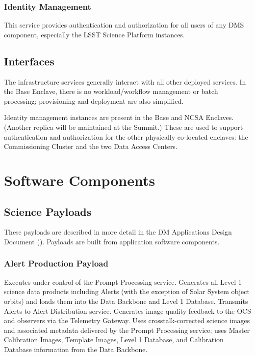 \documentclass[DM,toc]{lsstdoc}
\begin{document}
\subsubsection{Identity Management}\label{identity-management}

This service provides authentication and authorization for all users of
any DMS component, especially the LSST Science Platform instances.

\subsection{Interfaces}\label{infrastructure-interfaces}

The infrastructure services generally interact with all other deployed
services.  In the Base Enclave, there is no workload/workflow management or
batch processing; provisioning and deployment are also simplified.

Identity management instances are present in the Base and NCSA Enclaves.
(Another replica will be maintained at the Summit.)  These are used to support
authentication and authorization for the other physically co-located enclaves:
the Commissioning Cluster and the two Data Access Centers.


\section{Software Components}\label{software-components}

\subsection{Science Payloads}\label{science-payloads}

These payloads are described in more detail in the DM Applications Design
Document (). Payloads are built from application software
components.

\subsubsection{Alert Production Payload}\label{alert-production-payload}

Executes under control of the Prompt Processing service. Generates all
Level 1 science data products including Alerts (with the exception of
Solar System object orbits) and loads them into the Data Backbone and
Level 1 Database. Transmits Alerts to Alert Distribution service.
Generates image quality feedback to the OCS and observers via the
Telemetry Gateway. Uses crosstalk-corrected science images and
associated metadata delivered by the Prompt Processing service; uses
Master Calibration Images, Template Images, Level 1 Database, and
Calibration Database information from the Data Backbone.
\end{document}
